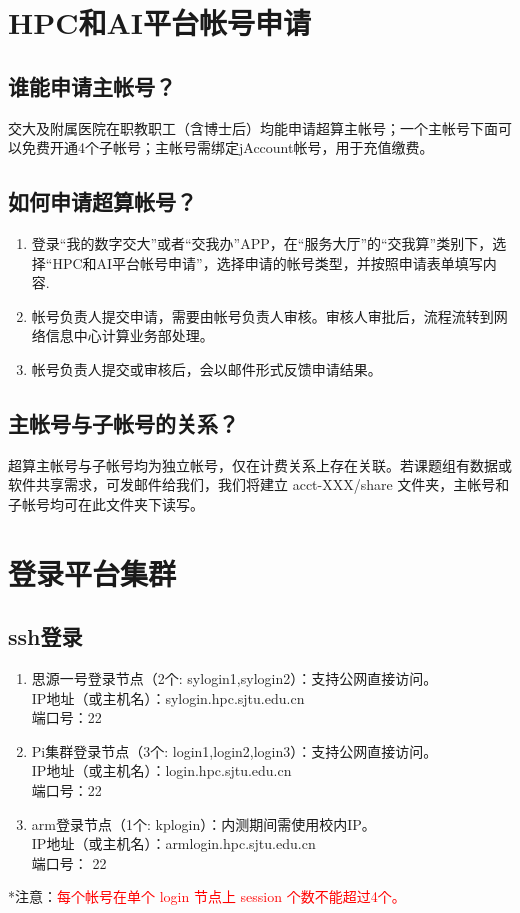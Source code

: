 \documentclass[cn, 12pt, hang, black, chinese]{elegantbook}
\begin{document}
\section{HPC和AI平台帐号申请}

\subsection*{谁能申请主帐号？}
交大及附属医院在职教职工（含博士后）均能申请超算主帐号；一个主帐号下面可以免费开通4个子帐号；主帐号需绑定jAccount帐号，用于充值缴费。

\subsection*{如何申请超算帐号？}
\begin{enumerate}
\item 登录“我的数字交大”或者“交我办”APP，在“服务大厅”的“交我算”类别下，选择“HPC和AI平台帐号申请”，选择申请的帐号类型，并按照申请表单填写内容.
\item 帐号负责人提交申请，需要由帐号负责人审核。审核人审批后，流程流转到网络信息中心计算业务部处理。
\item 帐号负责人提交或审核后，会以邮件形式反馈申请结果。
\end{enumerate}

\subsection*{主帐号与子帐号的关系？}
超算主帐号与子帐号均为独立帐号，仅在计费关系上存在关联。若课题组有数据或软件共享需求，可发邮件给我们，我们将建立 acct-XXX/share 文件夹，主帐号和子帐号均可在此文件夹下读写。

\section{登录平台集群}

\subsection*{ssh登录}
\begin{enumerate}
\item 思源一号登录节点（2个: sylogin1,sylogin2）：支持公网直接访问。\\IP地址（或主机名）：sylogin.hpc.sjtu.edu.cn\\端口号：22
\item Pi集群登录节点（3个: login1,login2,login3）：支持公网直接访问。\\IP地址（或主机名）：login.hpc.sjtu.edu.cn\\端口号：22
\item arm登录节点（1个: kplogin）：内测期间需使用校内IP。\\IP地址（或主机名）：armlogin.hpc.sjtu.edu.cn\\端口号： 22
\end{enumerate}
*注意：\textcolor{red}{每个帐号在单个 login 节点上 session 个数不能超过4个。}
\end{document}
